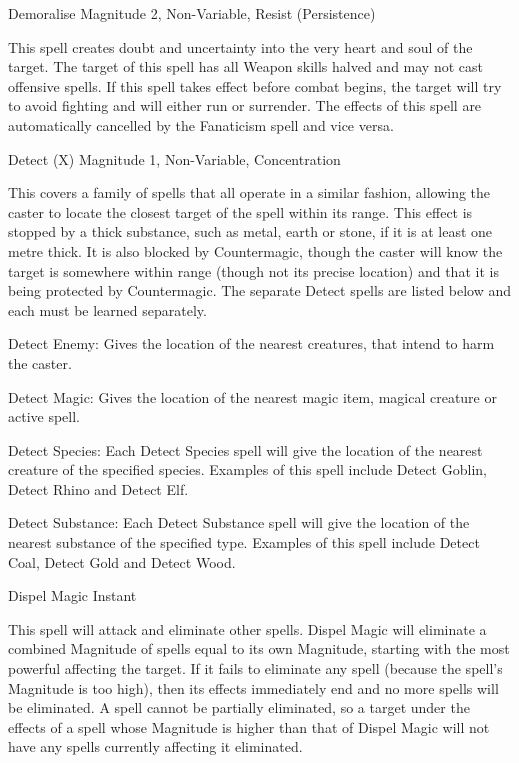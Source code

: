 \begin{rpg-spell}
{Demoralise}
{Magnitude 2, Non-Variable, Resist (Persistence)}

This spell creates doubt and uncertainty into the very heart and soul of the target. The target of this spell has all Weapon skills halved and may not cast offensive spells. If this spell takes effect before combat begins, the target will try to avoid fighting and will either run or surrender. The effects of this spell are automatically cancelled by the Fanaticism spell and vice versa. 
\end{rpg-spell}


\begin{rpg-spell}
{Detect (X)}
{Magnitude 1, Non-Variable, Concentration}

This covers a family of spells that all operate in a similar fashion, allowing the caster to locate the closest target of the spell within its range. This effect is stopped by a thick substance, such as metal, earth or stone, if it is at least one metre thick. It is also blocked by Countermagic, though the caster will know the target is somewhere within range (though not its precise location) and that it is being protected by Countermagic. The separate Detect spells are listed below and each must be learned separately.

\begin{rpg-list}
\item Detect Enemy: Gives the location of the nearest creatures, that intend to harm the caster. 
\item Detect Magic: Gives the location of the nearest magic item, magical creature or active spell. 
\item Detect Species: Each Detect Species spell will give the location of the nearest creature of the specified species. Examples of this spell include Detect Goblin, Detect Rhino and Detect Elf. 
\item Detect Substance: Each Detect Substance spell will give the location of the nearest substance of the specified type. Examples of this spell include Detect Coal, Detect Gold and Detect Wood. 
\end{rpg-list}
\end{rpg-spell}


\begin{rpg-spell}
{Dispel Magic}
{Instant}

This spell will attack and eliminate other spells. Dispel Magic will eliminate a combined Magnitude of spells equal to its own Magnitude, starting with the most powerful affecting the target. If it fails to eliminate any spell (because the spell’s Magnitude is too high), then its effects immediately end and no more spells will be eliminated. A spell cannot be partially eliminated, so a target under the effects of a spell whose Magnitude is higher than that of Dispel Magic will not have any spells currently affecting it eliminated. 
\end{rpg-spell}


